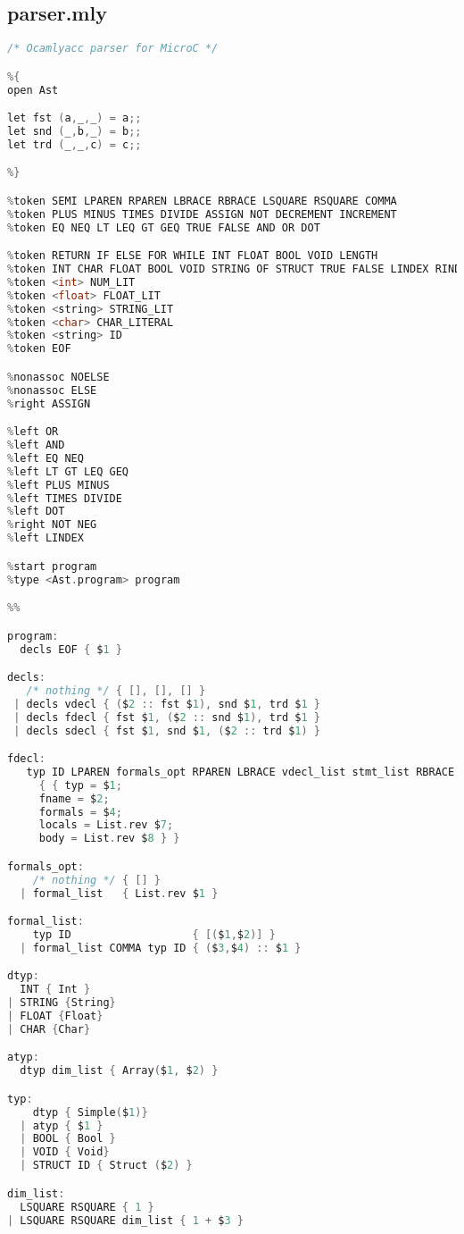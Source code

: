 \documentclass{article}
\begin{document}
\subsection{parser.mly}
\begin{lstlisting}[language=C]
/* Ocamlyacc parser for MicroC */

%{
open Ast

let fst (a,_,_) = a;;
let snd (_,b,_) = b;;
let trd (_,_,c) = c;;

%}

%token SEMI LPAREN RPAREN LBRACE RBRACE LSQUARE RSQUARE COMMA
%token PLUS MINUS TIMES DIVIDE ASSIGN NOT DECREMENT INCREMENT
%token EQ NEQ LT LEQ GT GEQ TRUE FALSE AND OR DOT

%token RETURN IF ELSE FOR WHILE INT FLOAT BOOL VOID LENGTH 
%token INT CHAR FLOAT BOOL VOID STRING OF STRUCT TRUE FALSE LINDEX RINDEX
%token <int> NUM_LIT
%token <float> FLOAT_LIT
%token <string> STRING_LIT
%token <char> CHAR_LITERAL
%token <string> ID
%token EOF

%nonassoc NOELSE
%nonassoc ELSE
%right ASSIGN 

%left OR
%left AND
%left EQ NEQ 
%left LT GT LEQ GEQ
%left PLUS MINUS
%left TIMES DIVIDE
%left DOT 
%right NOT NEG
%left LINDEX

%start program
%type <Ast.program> program

%%

program:
  decls EOF { $1 }

decls:
   /* nothing */ { [], [], [] }
 | decls vdecl { ($2 :: fst $1), snd $1, trd $1 }
 | decls fdecl { fst $1, ($2 :: snd $1), trd $1 }
 | decls sdecl { fst $1, snd $1, ($2 :: trd $1) }

fdecl:
   typ ID LPAREN formals_opt RPAREN LBRACE vdecl_list stmt_list RBRACE
     { { typ = $1;
	 fname = $2;
	 formals = $4;
	 locals = List.rev $7;
	 body = List.rev $8 } }

formals_opt:
    /* nothing */ { [] }
  | formal_list   { List.rev $1 }

formal_list:
    typ ID                   { [($1,$2)] }
  | formal_list COMMA typ ID { ($3,$4) :: $1 }

dtyp:
  INT { Int }
| STRING {String}
| FLOAT {Float}
| CHAR {Char}

atyp:
  dtyp dim_list { Array($1, $2) }

typ:
    dtyp { Simple($1)}
  | atyp { $1 }
  | BOOL { Bool }
  | VOID { Void}
  | STRUCT ID { Struct ($2) }

dim_list:
  LSQUARE RSQUARE { 1 }
| LSQUARE RSQUARE dim_list { 1 + $3 }




\end{lstlisting}
\end{document}
